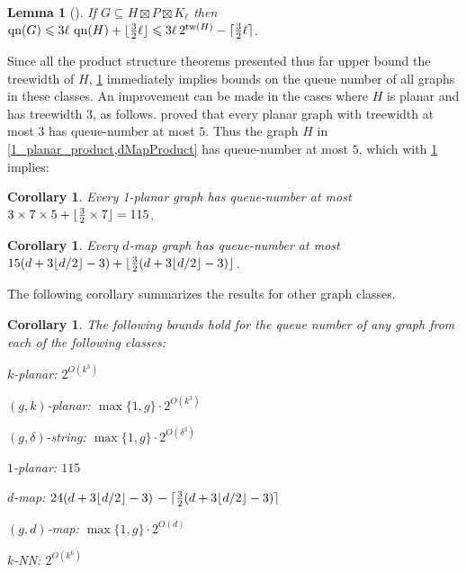 \documentclass{patmorin}
\theoremstyle{plain}
\newtheorem{lem}[thm]{Lemma}
\newtheorem{cor}[thm]{Corollary}
\theoremstyle{definition}
\newcommand{\note}[2]{\noindent{\color{red}[#1:~#2]}}
\DeclareMathOperator{\tw}{tw}
\DeclareMathOperator{\qn}{qn}
\DeclarePairedDelimiter{\ceil}{\lceil}{\rceil}
\DeclarePairedDelimiter{\floor}{\lfloor}{\rfloor}
\renewcommand{\leq}{\leqslant}
\begin{document}
\begin{lem}[\citep{DJMMUW20}]
\label{qn}
If $G\subseteq H \boxtimes P \boxtimes K_\ell$ then
$\qn(G) \leq  3 \ell \, \qn(H) + \floor{\tfrac{3}{2}\ell}
\leq 3 \ell \, 2^{\tw(H)}  - \ceil{\tfrac{3}{2}\ell}$.
\end{lem}

Since all the product structure theorems presented thus far upper bound the treewidth of $H$,
\cref{qn} immediately implies bounds on the queue number of all graphs in these classes.  An improvement can be made in the cases where $H$ is planar and has treewidth $3$, as follows.
\citet{ABGKP20} proved that every planar graph with treewidth at most $3$ has queue-number at most $5$. Thus the graph $H$ in \cref{1_planar_product,dMapProduct} has queue-number at most $5$, which with \cref{qn} implies:

\begin{cor}
\label{1PlanarQueue}
Every 1-planar graph has queue-number at most 
$3 \times 7 \times 5 + \floor{\tfrac{3}{2} \times 7} = 115$.
\end{cor}

\begin{cor}
\label{dMapQueue}
Every $d$-map graph has queue-number at most 
$15 (d+3\floor{d/2}-3)  + \floor{\tfrac{3}{2}(d+3\floor{d/2}-3)}$.
\note{DW}{I have updated this bound using the better qn bound for planar 3-trees. Note that with $d=3$ we get the original bound of 49.}
\end{cor}




The following corollary summarizes the results for other graph classes.
\begin{cor}\label{q_cor}
  The following bounds hold for the queue number of any graph from each of the following classes:
  \begin{compactenum}
    \item $k$-planar: $2^{O(k^3)}$
    \item $(g,k)$-planar: $\max\{1,g\}\cdot 2^{O(k^3)}$
    \item $(g,\delta)$-string: $\max\{1,g\}\cdot 2^{O(\delta^3)}$
    \item $1$-planar: $115$ \note{DW}{delete?}
    \item $d$-map: $24 (d+3\floor{d/2}-3) \,  - \ceil{\tfrac{3}{2} (d+3\floor{d/2}-3)}$ \note{DW}{delete?}
    \item $(g,d)$-map: $\max\{1,g\}\cdot 2^{O(d)}$
    \item $k$-NN: $2^{O(k^6)}$
  \end{compactenum}
\end{cor}
\end{document}

